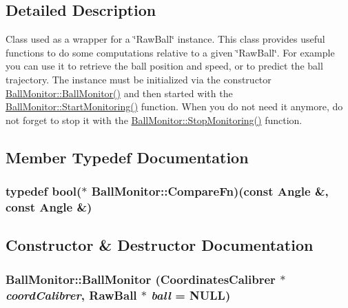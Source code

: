 \subsection{Detailed Description}
Class used as a wrapper for a \char`\"{}RawBall\char`\"{} instance. This class provides useful functions to do some computations relative to a given \char`\"{}RawBall\char`\"{}. For example you can use it to retrieve the ball position and speed, or to predict the ball trajectory. The instance must be initialized via the constructor \hyperlink{classBallMonitor_a176a257973eefa572b6972aa6b5a605d}{BallMonitor::BallMonitor()} and then started with the \hyperlink{classBallMonitor_a4d2b3aa764f5d4f4d5f58b7530565f90}{BallMonitor::StartMonitoring()} function. When you do not need it anymore, do not forget to stop it with the \hyperlink{classBallMonitor_af71db12abeb1f10f7be58eb7591910a3}{BallMonitor::StopMonitoring()} function. 

\subsection{Member Typedef Documentation}
\hypertarget{classBallMonitor_a5ad781c99d5b43bee7c838de9da75527}{
\subsubsection[{CompareFn}]{\setlength{\rightskip}{0pt plus 5cm}typedef bool($\ast$ {\bf BallMonitor::CompareFn})(const {\bf Angle} \&, const {\bf Angle} \&)}}
\label{classBallMonitor_a5ad781c99d5b43bee7c838de9da75527}


\subsection{Constructor \& Destructor Documentation}
\hypertarget{classBallMonitor_a176a257973eefa572b6972aa6b5a605d}{
\subsubsection[{BallMonitor}]{\setlength{\rightskip}{0pt plus 5cm}BallMonitor::BallMonitor ({\bf CoordinatesCalibrer} $\ast$ {\em coordCalibrer}, \/  RawBall $\ast$ {\em ball} = {\ttfamily NULL})}}
\label{classBallMonitor_a176a257973eefa572b6972aa6b5a605d}


